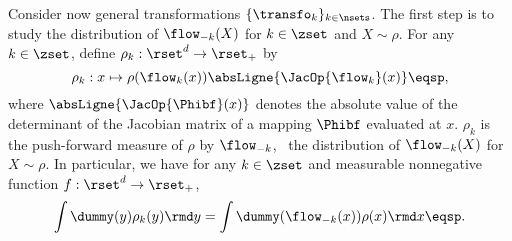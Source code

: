 
Consider now general transformations $\{\transfo_k\}_{k\in\nsets}$. %
The first step is to study
 the distribution of $\flow_{-k}(X)$ for $k \in \zset$
and $X\sim \rho$. 
For any $k \in \zset$, define $\rho_k : \rset^d \to \rset_+$ by
\begin{equation}
\label{eq:definition-rho-k}
    \rho_k: x\mapsto \rho(\flow_k(x))  \absLigne{\JacOp{\flow_k}(x)}\eqsp,
\end{equation}
where $\absLigne{\JacOp{\Phibf}(x)}$ denotes the absolute value of the determinant of the Jacobian matrix of a mapping $\Phibf$ evaluated at $x$.
$\rho_k$ is the push-forward measure of $\rho$ by $\flow_{-k}$, \ie~the distribution of $\flow_{-k}(X)$ for $X \sim \rho$. In particular, we have for any $k \in \zset$ and  measurable nonnegative function $f:\rset^d \to \rset_+$,
\begin{equation}
    \label{eq:inf_non_eq_av_0}
    \int \dummy(y)    \rho_k(y)\rmd y =
  \int \dummy(\flow_{-k}(x)) \rho(x)\rmd x  \eqsp.
\end{equation}

